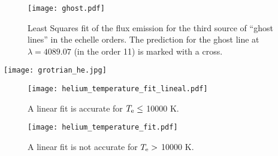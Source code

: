 \documentclass[fleqn,usenatbib]{mnras}
\newcommand{\jorge}[1]{{\color{magenta}J: #1}}
\begin{document}
\begin{figure}
\texttt{[image: ghost.pdf]}
\caption{Least Squares fit of the flux emission for the third source of ``ghost lines'' in the echelle orders. The prediction for the ghost line at $\lambda = 4089.07$ (in the order 11) is marked with a cross.}
\label{fig:ghost_fit}
\end{figure}

\begin{figure*}
\texttt{[image: grotrian\_he.jpg]}
\caption{Grotrian diagram of \mbox{He}\thinspace \mbox{I} for both configurations: triplet and singlet.}
\label{fig:grotrian_he}
\end{figure*}



\begin{figure*}

\begin{subfigure}{8.5cm}
    \centering\texttt{[image: helium\_temperature\_fit\_lineal.pdf]}
    \caption{A linear fit is accurate for $T_{\rm e}\leq$ 10000 K.}
    \label{fig:7281_temperature_helium_dependence_a}
\end{subfigure}
\begin{subfigure}{8.5cm}
    \centering\texttt{[image: helium\_temperature\_fit.pdf]}
    \caption{A linear fit is not accurate for $T_{\rm e} >$ 10000 K.}
    \label{fig:7281_temperature_helium_dependence_b}
\end{subfigure}
\caption{Dependence of $I$(\mbox{He}\thinspace \mbox{I} $\lambda$7281)/$I$(\mbox{He}\thinspace \mbox{I} $\lambda$6678) on the physical conditions.}
\label{fig:7281_temperature_helium_dependence}

\end{figure*}
\end{document}
